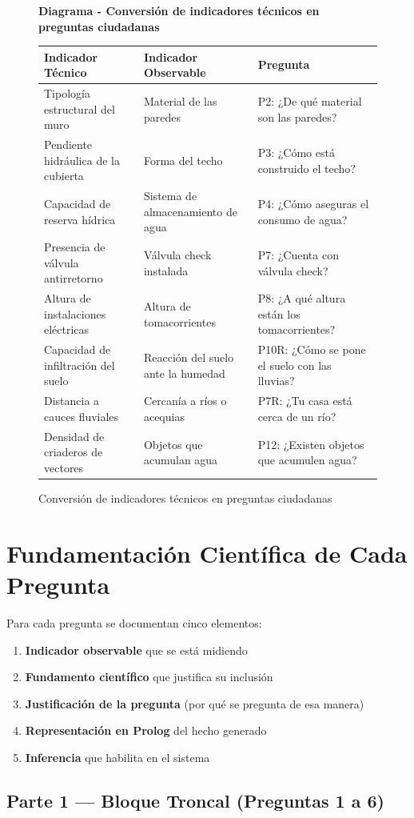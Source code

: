 \documentclass[12pt, letterpaper]{article}
\newcommand{\diagrambox}[3]{%
  \begin{figure}[H]
    \centering
    \begin{tcolorbox}[colback=white!90!blue, colframe=blue!60!black, width=\linewidth, arc=3mm, auto outer arc]
      \centering
      \textbf{Diagrama - #2} %
      \vspace{0.5cm}
      \parbox{0.95\linewidth}{\centering #3}
    \end{tcolorbox}
    \caption{#2}
    \label{fig:#1}
  \end{figure}
}
\begin{document}
\diagrambox{conversion_indicadores}{Conversión de indicadores técnicos en preguntas ciudadanas}{
  \begin{tabular}{p{4cm} p{4cm} p{6cm}}
    \textbf{Indicador Técnico} & \textbf{Indicador Observable} & \textbf{Pregunta} \\
    \hline
    Tipología estructural del muro & Material de las paredes & P2: ¿De qué material son las paredes? \\
    Pendiente hidráulica de la cubierta & Forma del techo & P3: ¿Cómo está construido el techo? \\
    Capacidad de reserva hídrica & Sistema de almacenamiento de agua & P4: ¿Cómo aseguras el consumo de agua? \\
    Presencia de válvula antirretorno & Válvula check instalada & P7: ¿Cuenta con válvula check? \\
    Altura de instalaciones eléctricas & Altura de tomacorrientes & P8: ¿A qué altura están los tomacorrientes? \\
    Capacidad de infiltración del suelo & Reacción del suelo ante la humedad & P10R: ¿Cómo se pone el suelo con las lluvias? \\
    Distancia a cauces fluviales & Cercanía a ríos o acequias & P7R: ¿Tu casa está cerca de un río? \\
    Densidad de criaderos de vectores & Objetos que acumulan agua & P12: ¿Existen objetos que acumulen agua?
  \end{tabular}
}

\section{Fundamentación Científica de Cada Pregunta}

Para cada pregunta se documentan cinco elementos:

\begin{enumerate}
  \item \textbf{Indicador observable} que se está midiendo
  \item \textbf{Fundamento científico} que justifica su inclusión
  \item \textbf{Justificación de la pregunta} (por qué se pregunta de esa manera)
  \item \textbf{Representación en Prolog} del hecho generado
  \item \textbf{Inferencia} que habilita en el sistema
\end{enumerate}

\subsection{Parte 1 — Bloque Troncal (Preguntas 1 a 6)}
\end{document}

